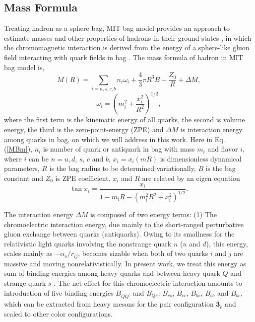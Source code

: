 \documentclass[prd,twocolumn,floatfix,nofootinbib]{revtex4}
\begin{document}
\subsection{Mass Formula}
Treating hadron as a sphere bag, MIT bag model provides an approach to estimate masses and other properties of hadrons in their ground states \cite{Johnson:1975zp,DeGrand:1975cf}, 
in which the chromomagnetic interaction is derived from the energy of a sphere-like gluon field interacting with quark fields in bag \cite{DeGrand:1975cf}. 
The mass formula of hadron in MIT bag model is,
\begin{equation}\label{MBm}
    M\left(R\right)=\sum_{i=n,s,c,b} n_{i}\omega_{i}+\frac{4}{3}\pi R^{3}B-\frac{Z_{0}}{R}+\Delta M,
\end{equation}
\begin{equation}\label{freq}
    \omega_{i}=\left(m_{i}^{2}+\frac{x_{i}^{2}}{R^2}\right)^{1/2},
\end{equation}
where the first term is the kinematic energy of all quarks, the second is volume energy, the third is the zero-point-energy (ZPE) and $\Delta M$ is interaction energy among quarks in bag, on which we will address in this work. 
Here in Eq. (\ref{MBm}), $n_{i}$ is number of quark or antiquark in bag with mass $m_{i}$ and flavor $i$, where $i$ can be $n=u,d$, $s$, $c$ and $b$, $x_{i}=x_{i}(mR)$ is dimensionless dynamical parameters, 
$R$ is the bag radius to be determined variationally, $B$ is the bag constant and $Z_{0}$ is ZPE coefficient. $x_{i}$ and $R$ are related by an eigen equation
\begin{equation}\label{transc}
    \tan x_{i}=\frac{x_{i}}{1-m_{i}R-\left(m_{i}^{2}R^{2}+x_{i}^{2}\right)^{1/2}}.
\end{equation}

The interaction energy $\Delta M$ is composed of two energy terms:
(1) The chromoelectric interaction energy, due mainly to the short-ranged perturbative gluon exchange between quarks (antiquarks). 
Owing to its smallness for the relativistic light quarks involving the nonstrange quark $n$ ($u$ and $d$), this energy, scales mainly as $-\alpha_{s}/r_{ij}$, becomes sizable when both of two quarks $i$ and $j$ are massive and moving nonrelativistically. 
In present work, we treat this energy as sum of binding energies among heavy quarks and between heavy quark $Q$ and strange quark $s$ \cite{Karliner:2014gca,Karliner:2017elp,Karliner:2018bms}.
The net effect for this chromoelectric interaction amounts to introduction of five binding energies $B_{QQ^{\prime}}$ and $B_{Qs}$: $B_{cs}$, $B_{cc}$, $B_{bs}$, $B_{bb}$ and $B_{bc}$, 
which can be extracted from heavy mesons for the pair configuration $\boldsymbol{\bar{3}}_{c}$ and scaled to other color configurations.
\end{document}
